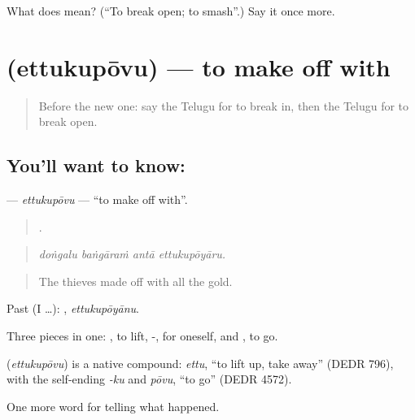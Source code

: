 \begin{tcolorbox}[breakable,colback=teal!4,colframe=teal!35!black,title={Before you move on}]
What does   mean? (\textquotedblleft{}To break open; to smash\textquotedblright{}.) Say it once more.
\end{tcolorbox}
\section[\texorpdfstring{\te{ఎత్తుకుపోవు} (ettukupōvu)}{ఎత్తుకుపోవు (ettukupōvu)}]{ (ettukupōvu) — to make off with}

\label{lesson:TE-C329-ettukupovu}



\begin{quote}
Before the new one: say the Telugu for to break in, then the Telugu for to break open.
\end{quote}

\subsection*{You'll want to know: }
\textbf{} — \emph{ettukupōvu} — \textquotedblleft{}to make off with\textquotedblright{}.

\begin{quote}
   .
\end{quote}

\begin{quote}
\emph{doṅgalu baṅgāraṁ antā ettukupōyāru.}
\end{quote}

\begin{quote}
The thieves made off with all the gold.
\end{quote}

Past (I …): , \emph{ettukupōyānu}.

Three pieces in one: , to lift, -, for oneself, and , to go.

\begin{cousinweb}
\textbf{} (\emph{ettukupōvu}) is a native compound: \emph{ettu}, \textquotedblleft{}to lift up, take away\textquotedblright{} (DEDR 796), with the self-ending \emph{-ku} and \emph{pōvu}, \textquotedblleft{}to go\textquotedblright{} (DEDR 4572).
\end{cousinweb}

\begin{grammarlens}[title={What you've built}]
One more word for telling what happened.
\end{grammarlens}

